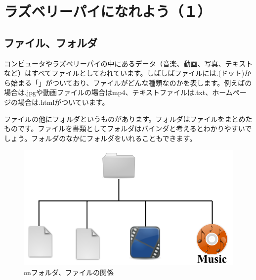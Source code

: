 \clearpage

\section{ラズベリーパイになれよう（１）}
\subsection{ファイル、フォルダ}
コンピュータやラズベリーパイの中にあるデータ（音楽、動画、写真、テキストなど）はすべてファイルとしてわれています。しばしばファイルには.(ドット)から始まる「」がついており、ファイルがどんな種類なのかを表します。例えばの場合は.jpgや動画ファイルの場合はmp4、テキストファイルは.txt、ホームページの場合は.htmlがついています。

ファイルの他にフォルダというものがあります。フォルダはファイルをまとめたものです。ファイルを書類としてフォルダはバインダと考えるとわかりやすいでしょう。フォルダのなかにフォルダをいれることもできます。

\begin{figure}[hb]
  \centering
  \begin{minipage}{0.76\textwidth}
    \includegraphics[width=\linewidth]{text01-img/figure15.png}
    \caption{onフォルダ、ファイルの関係}
  \end{minipage}
\end{figure}

